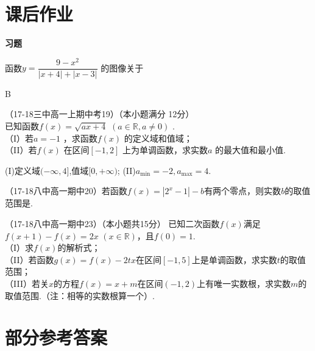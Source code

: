 \section{课后作业}
  \begin{exercise}{\large \bf 习\hspace{0.6em}题}
    \item%
      函数$y=\dfrac{9-x^2}{|x+4|+|x-3|}$ 的图像关于\xz
      \begin{answer}
      B
      \end{answer}
    \item
      （17-18三中高一上期中考19）（本小题满分 12分）\\
      已知函数$f(x)=\sqrt{ax+4}$ $(a\in\mathbb{R},a\neq0)$  .\\
      （I）若$a=-1$ ，求函数$f(x)$ 的定义域和值域；\\
      （II）若$f(x)$ 在区间$[-1,2] $ 上为单调函数，求实数$a$ 的最大值和最小值.\\
      \begin{answer}
      (I)定义域$(-\infty,4]$,值域$[0,+\infty)$;
      (II)$a_{\min}=-2,a_{\max}=4 $.
      \end{answer}
    \vspace{12em}
    \item
      （17-18八中高一期中20）若函数$f(x)=|2^x-1|-b $有两个零点，则实数$b$的取值范围是\tk.\\
    \item
      （17-18八中高一期中23）（本小题共15分）
      已知二次函数$f(x)$满足$f(x+1)-f(x)=2x $ $(x\in\mathbb{R})$，且$f(0)=1$.\\
      （I）求$f(x)$的解析式；\\
      （II）若函数$g(x)=f(x)-2tx$在区间$[-1,5]$上是单调函数，求实数$t$的取值范围；\\
      （III）若关$x$的方程$f(x)=x+m $在区间$(-1,2)$上有唯一实数根，求实数$m$的取值范围.（注：相等的实数根算一个）.\\
    \vspace{16em}
  \end{exercise}
\stopexercise

\section{部分参考答案}
  \begin{multicols}{2}
    \printanswer
  \end{multicols}
